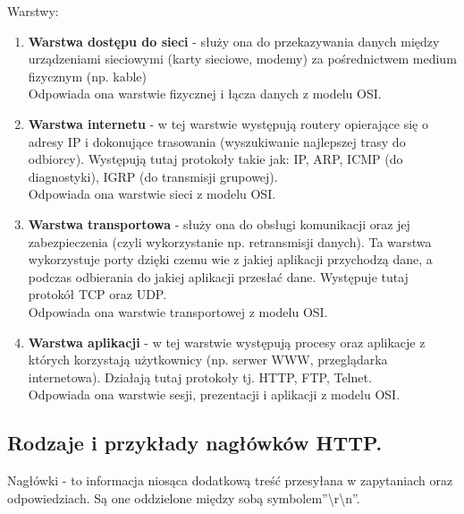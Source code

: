 \documentclass[a4paper,12pt,oneside]{book}
\begin{document}
			Warstwy:
			\begin{enumerate}
				\item \textbf{Warstwa dostępu do sieci} - służy ona do przekazywania danych między
				urządzeniami sieciowymi (karty sieciowe, modemy) za pośrednictwem medium
				fizycznym (np. kable)\\
				Odpowiada ona warstwie fizycznej i łącza danych z modelu OSI.
				\item \textbf{Warstwa internetu} - w tej warstwie występują routery opierające się o adresy IP i
				dokonujące trasowania (wyszukiwanie najlepszej trasy do odbiorcy).
				Występują tutaj protokoły takie jak: IP, ARP, ICMP (do diagnostyki), IGRP (do
				transmisji grupowej).\\
				Odpowiada ona warstwie sieci z modelu OSI.
				\item \textbf{Warstwa transportowa} - służy ona do obsługi komunikacji oraz jej zabezpieczenia
				(czyli wykorzystanie np. retransmisji danych). Ta warstwa wykorzystuje porty dzięki
				czemu wie z jakiej aplikacji przychodzą dane, a podczas odbierania do jakiej aplikacji
				przesłać dane. Występuje tutaj protokół TCP oraz UDP.\\
				Odpowiada ona warstwie transportowej z modelu OSI.
				\item \textbf{Warstwa aplikacji} - w tej warstwie występują procesy oraz aplikacje z których
				korzystają użytkownicy (np. serwer WWW, przeglądarka internetowa). Działają tutaj
				protokoły tj. HTTP, FTP, Telnet.\\
				Odpowiada ona warstwie sesji, prezentacji i aplikacji z modelu OSI.
			\end{enumerate}
			
			\newpage\subsection{Rodzaje i przykłady nagłówków HTTP.}
				Nagłówki - to informacja niosąca dodatkową treść przesyłana w zapytaniach oraz
				odpowiedziach. Są one oddzielone między sobą symbolem”\textbackslash r\textbackslash n”.
				
\end{document}
